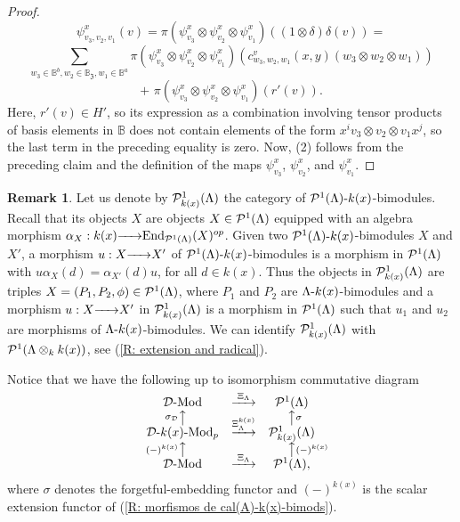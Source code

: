 \documentclass{article}
\theoremstyle{definition}
\newtheorem{remark}[theorem]{Remark}
\newcommand{\End}{{ \rm End }}
\newcommand{\Mod}{{ \rm Mod }}
\renewcommand{\frak}{\mathfrak}
\newcommand{\g}{\hbox{-}}
\newcommand{\hueca}[1]{\mathbb{#1}}
\newcommand{\rightmap}[1]{\smash{\mathop{\hbox to 
20pt{\rightarrowfill}}\limits^{#1}}}
\newcommand{\shortlmapup}[1]
{\llap{$\vcenter{\hbox{$\scriptstyle#1$}}$}\big\uparrow}
\newcommand{\shortrmapup}[1]
{\big\uparrow\rlap{$\vcenter{\hbox{$\scriptstyle#1$}}$}}
\begin{document}
\begin{proof}
\vbox{$$
\psi^x_{v_3,v_2,v_1}(v)
=\pi (\psi^x_{v_3}\otimes\psi^x_{v_2}\otimes\psi^x_{v_1})((1\otimes\delta)\delta(v))=$$
$$
\sum_{w_3\in \hueca{B}^b,w_2\in \hueca{B}_{\frak{Z}},w_1\in \hueca{B}^a}\pi (\psi^x_{v_3}\otimes\psi^x_{v_2}\otimes\psi^x_{v_1})(c^v_{w_3,w_2,w_1}(x,y)(w_3\otimes w_2\otimes w_1))$$
$$+\,\,\pi (\psi^x_{v_3}\otimes\psi^x_{v_2}\otimes\psi^x_{v_1})(r'(v)).$$}
Here, $r'(v)\in H'$, so its expression as a combination involving  tensor products of basis  elements in $\hueca{B}$ does not contain elements of the form $x^iv_3\otimes v_2\otimes v_1x^j$, so the last term in the preceding equality is zero.  Now, (2) follows from the preceding claim and the definition of the maps $\psi^x_{v_3}$, $\psi^x_{v_2}$, and $\psi^x_{v_1}$.  
\end{proof}

 \begin{remark} Let us denote by 
 ${\cal P}^1_{k(x)}(\Lambda)$ the category of 
 ${\cal P}^1(\Lambda)\g k(x)$-bimodules. Recall that its objects $X$ are objects  $X\in {\cal P}^1(\Lambda)$ equipped with an algebra morphism $\alpha_X:k(x)\rightmap{}\End_{{\cal P}^1(\Lambda)}(X)^{op}$. Given two ${\cal P}^1(\Lambda)\g k(x)$-bimodules $X$ and $X'$, a morphism  $u:X\rightmap{}X'$ of ${\cal P}^1(\Lambda)\g k(x)$-bimodules is a morphism in ${\cal P}^1(\Lambda)$ with $u\alpha_X(d)=\alpha_{X'}(d)u$, for all $d\in k(x)$. Thus the objects in ${\cal P}_{k(x)}^1(\Lambda)$ are triples $X=(P_1,P_2,\phi)\in {\cal P}^1(\Lambda)$, where $P_1$ and $P_2$ are $\Lambda\g k(x)$-bimodules and a morphism $u:X\rightmap{}X'$ in ${\cal P}_{k(x)}^1(\Lambda)$  is a morphism in ${\cal P}^1(\Lambda)$ such that $u_1$ and $u_2$ are morphisms of $\Lambda\g k(x)$-bimodules. We can identify ${\cal P}_{k(x)}^1(\Lambda)$ with ${\cal P}^1(\Lambda\otimes_kk(x))$, see (\ref{R: extension and radical}).
 
 Notice that we have the following up to isomorphism commutative diagram
$$\begin{matrix}
{\cal D}\g\Mod&\rightmap{ \ \Xi_\Lambda \ }&{\cal P}^1(\Lambda)\\
\shortlmapup{\sigma_{{\cal D}}}&&\shortrmapup{\sigma}\\
{\cal D}\g k(x)\g\Mod_p&\rightmap{ \Xi_\Lambda^{k(x)}}&{\cal P}^1_{k(x)}(\Lambda)\\
\shortlmapup{(-)^{k(x)}}&&\shortrmapup{(-)^{k(x)}}\\
{\cal D}\g\Mod&\rightmap{ \ \Xi_\Lambda \ }&{\cal P}^1(\Lambda),\\
\end{matrix}$$
where $\sigma$ denotes the forgetful-embedding functor and $(-)^{k(x)}$ is the scalar extension functor of (\ref{R: morfismos de cal(A)-k(x)-bimods}). 
 \end{remark}
\end{document}
